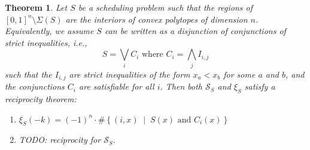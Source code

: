 \documentclass[12pt,reqno]{amsart}
\numberwithin{definition}{section}
\newtheorem{theorem}[definition]{Theorem}
\theoremstyle{definition}
\newcommand{\SSS}{\mathcal{S}}
\newcommand{\mset}[2]{ \left\{ #1 \; \middle| \; #2 \right\}}
\begin{document}



\begin{theorem}\label{posets}
Let $S$ be a scheduling problem such that the regions of $[0,1]^n\setminus\Sigma(S)$ are the interiors of convex polytopes of dimension $n$. Equivalently, we assume $S$ can be written as a disjunction of conjunctions of strict inequalities, i.e.,
\[
  S = \bigvee_i C_i \text{ where } C_i = \bigwedge_j I_{i,j}
\] 
such that the $I_{i,j}$ are strict inequalities of the form $x_a < x_b$ for some $a$ and $b$, and the conjunctions $C_i$ are satisfiable for all $i$. Then both $\SSS_S$ and $\xi_S$ satisfy a reciprocity theorem:
\begin{enumerate}
\item $\xi_S(-k) = (-1)^n\cdot \#\mset{(i,x)}{S(x) \text{ and } C_i(x)}$
\item TODO: reciprocity for $\SSS_S$.
\end{enumerate}
\end{theorem}


\end{document}

